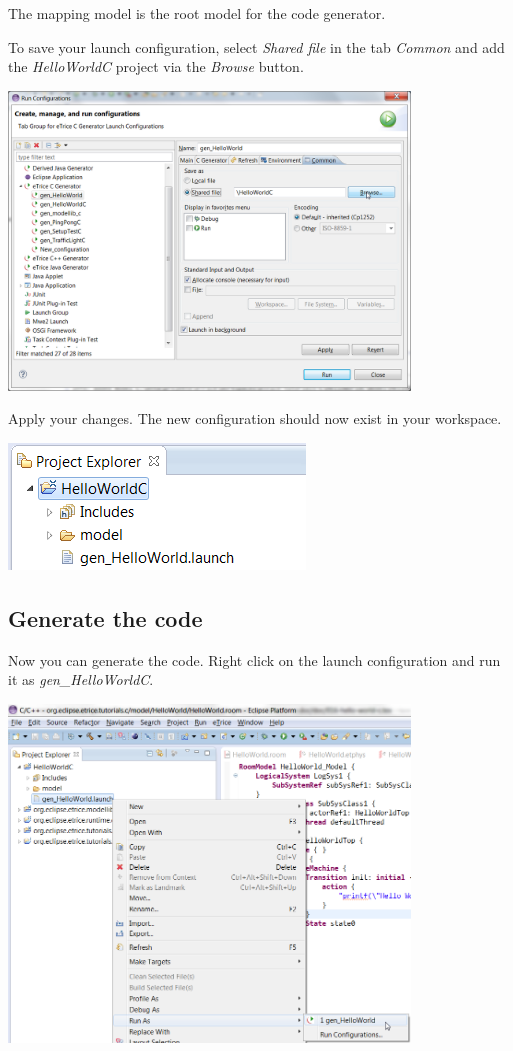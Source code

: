 The mapping model is the root model for the code generator.

To save your launch configuration, select \textit{Shared file} in the tab \textit{Common} and add the \textit{HelloWorldC} project via the 
\textit{Browse} button.

\includegraphics[width=0.8\textwidth]{images/016-HelloWorldC10.png}

Apply your changes. The new configuration should now exist in your workspace.

\includegraphics{images/016-HelloWorldC11.png}


\subsection{Generate the code}

Now you can generate the code. Right click on the launch configuration and run it 
as \textit{gen\_HelloWorldC}.

\includegraphics[width=0.8\textwidth]{images/016-HelloWorldC12.png}

